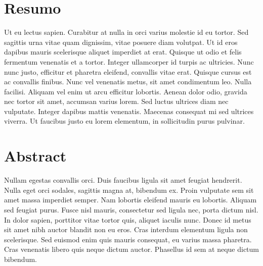 \chapter*{Resumo}
Ut eu lectus sapien. Curabitur at nulla in orci varius molestie id eu tortor. Sed sagittis urna vitae quam dignissim, vitae posuere diam volutpat. Ut id eros dapibus mauris scelerisque aliquet imperdiet at erat. Quisque ut odio et felis fermentum venenatis et a tortor. Integer ullamcorper id turpis ac ultricies. Nunc nunc justo, efficitur et pharetra eleifend, convallis vitae erat. Quisque cursus est ac convallis finibus. Nunc vel venenatis metus, sit amet condimentum leo. Nulla facilisi. Aliquam vel enim ut arcu efficitur lobortis. Aenean dolor odio, gravida nec tortor sit amet, accumsan varius lorem. Sed luctus ultrices diam nec vulputate. Integer dapibus mattis venenatis. Maecenas consequat mi sed ultrices viverra. Ut faucibus justo eu lorem elementum, in sollicitudin purus pulvinar.

\chapter*{Abstract}
Nullam egestas convallis orci. Duis faucibus ligula sit amet feugiat hendrerit. Nulla eget orci sodales, sagittis magna at, bibendum ex. Proin vulputate sem sit amet massa imperdiet semper. Nam lobortis eleifend mauris eu lobortis. Aliquam sed feugiat purus. Fusce nisl mauris, consectetur sed ligula nec, porta dictum nisl. In dolor sapien, porttitor vitae tortor quis, aliquet iaculis nunc. Donec id metus sit amet nibh auctor blandit non eu eros. Cras interdum elementum ligula non scelerisque. Sed euismod enim quis mauris consequat, eu varius massa pharetra. Cras venenatis libero quis neque dictum auctor. Phasellus id sem at neque dictum bibendum.